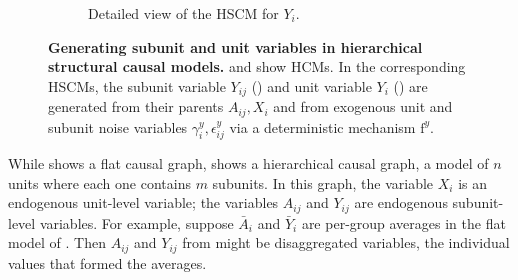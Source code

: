 \documentclass[12pt]{article}
\newcommand{\f}{\mathrm{f}}
\begin{document}
\begin{figure}[t]
\begin{subfigure}[t]{0.4\textwidth}
\end{subfigure}
\begin{subfigure}[t]{0.4\textwidth}
\caption{Detailed view of the HSCM for $Y_{i}$.} \label{fig:hcm_unit_gen_detailed}
\centering
{}
\end{subfigure}

\caption{\textbf{Generating subunit and unit variables in hierarchical structural causal models.}  and  show HCMs. In the corresponding HSCMs, the subunit variable $Y_{ij}$ () and unit variable $Y_i$ () are generated from their parents $A_{ij},X_i$ and from exogenous unit and subunit noise variables $\gamma_i^{y},\epsilon^y_{ij}$ via a deterministic mechanism $\f^{y}$.}

\label{fig:hcm_examples}

\end{figure}
 
While  shows a flat causal graph,  shows a hierarchical causal graph, a model of $n$ units where each one contains $m$ subunits.  In this graph, the variable $X_i$ is an endogenous unit-level variable; the variables $A_{ij}$ and $Y_{ij}$ are endogenous subunit-level variables. For example, suppose $\bar{A}_i$ and $\bar{Y}_i$ are per-group averages in the flat model of .  Then $A_{ij}$ and $Y_{ij}$ from  might be disaggregated variables, the individual values that formed the averages.
\end{document}
